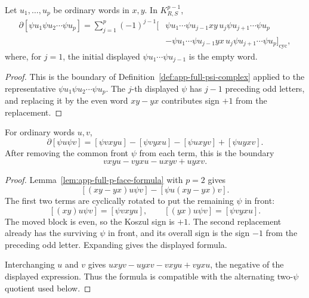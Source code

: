 \begin{lem}
\label{lem:app-full-p-face-formula}
  Let \(u_1,\ldots,u_p\) be ordinary words in \(x,y\).  In
  \(K^{p-1}_{R,S}\),
  \[
  \begin{aligned}
    \partial[\psi u_1\psi u_2\cdots\psi u_p]
      =
      \sum_{j=1}^p(-1)^{j-1}
      [&\psi u_1\cdots\psi u_{j-1}xy\,u_j\psi u_{j+1}\cdots\psi u_p\\
       &-\psi u_1\cdots\psi u_{j-1}yx\,u_j\psi u_{j+1}\cdots\psi u_p]_{\mathrm{cyc}},
  \end{aligned}
  \]
  where, for \(j=1\), the initial displayed \(\psi u_1\cdots\psi u_{j-1}\)
  is the empty word.
\end{lem}

\begin{proof}
  This is the boundary of Definition~\ref{def:app-full-psi-complex} applied
  to the representative \(\psi u_1\psi u_2\cdots\psi u_p\).  The \(j\)-th
  displayed \(\psi\) has \(j-1\) preceding odd letters, and replacing it by
  the even word \(xy-yx\) contributes sign \(+1\) from the replacement.
\end{proof}

\begin{lem}
\label{lem:app-full-two-psi-boundary-sign}
  For ordinary words \(u,v\),
  \[
    \partial[\psi u\psi v]
      =[\psi vxyu]-[\psi vyxu]-[\psi uxyv]+[\psi uyxv].
  \]
  After removing the common front \(\psi\) from each term, this is the
  boundary
  \[
    vxyu-vyxu-uxyv+uyxv.
  \]
\end{lem}

\begin{proof}
  Lemma~\ref{lem:app-full-p-face-formula} with \(p=2\) gives
  \[
    [(xy-yx)u\psi v]-[\psi u(xy-yx)v].
  \]
  The first two terms are cyclically rotated to put the remaining \(\psi\) in
  front:
  \[
    [(xy)u\psi v]=[\psi vxyu],\qquad
    [(yx)u\psi v]=[\psi vyxu].
  \]
  The moved block is even, so the Koszul sign is \(+1\).  The second
  replacement already has the surviving \(\psi\) in front, and its overall
  sign is the sign \(-1\) from the preceding odd letter.  Expanding gives the
  displayed formula.

  Interchanging \(u\) and \(v\) gives
  \(uxyv-uyxv-vxyu+vyxu\), the negative of the displayed expression.  Thus
  the formula is compatible with the alternating two-\(\psi\) quotient used
  below.
\end{proof}

